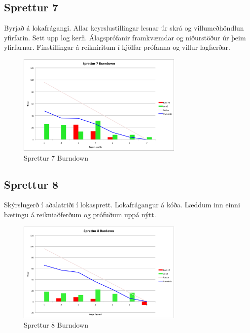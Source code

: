 \documentclass{article}
\begin{document}
\subsection{Sprettur 7}
Byrjað á lokafrágangi. Allar keyrslustillingar lesnar úr skrá og villumeðhöndlun yfirfarin. Sett upp log kerfi. Álagsprófanir framkvæmdar og 
niðurstöður úr þeim yfirfarnar. Fínstillingar á reikniritum í kjölfar prófanna og villur lagfærðar. 

\begin{figure}[H]
 \centering
 \includegraphics[width=0.72\textwidth]{Sprettur7_Burndown.png}
 \caption{Sprettur 7 Burndown}
\end{figure}

\subsection{Sprettur 8}
Skýrslugerð í aðalatriði í lokasprett. Lokafrágangur á kóða. Læddum inn einni bætingu á reikniaðferðum og prófuðum uppá nýtt.
\begin{figure}[H]
 \centering
 \includegraphics[width=0.72\textwidth]{Sprettur8_Burndown.png}
 \caption{Sprettur 8 Burndown}
\end{figure}
\end{document}
